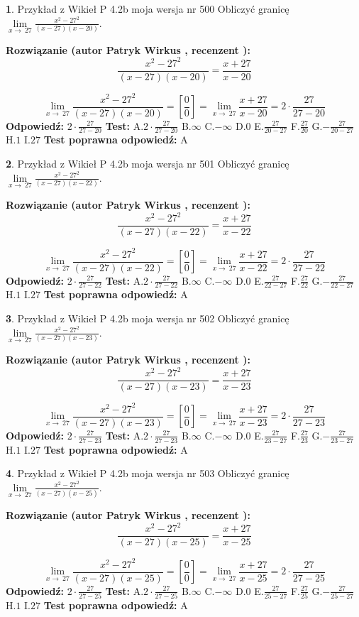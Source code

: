 \documentclass[12pt, a4paper]{article}
\theoremstyle{definition} %
\newtheorem{zad}{}
\newcommand{\zadStart}[1]{\begin{zad}#1\newline}
\newcommand{\zadStop}{\end{zad}}
\newcommand{\rozwStart}[2]{\noindent \textbf{Rozwiązanie (autor #1 , recenzent #2): }\newline}
\newcommand{\rozwStop}{\newline}
\newcommand{\odpStart}{\noindent \textbf{Odpowiedź:}\newline}
\newcommand{\odpStop}{\newline}
\newcommand{\testStart}{\noindent \textbf{Test:}\newline}
\newcommand{\testStop}{\newline}
\newcommand{\kluczStart}{\noindent \textbf{Test poprawna odpowiedź:}\newline}
\newcommand{\kluczStop}{\newline}
\begin{document}
\zadStart{Przykład z Wikieł P 4.2b moja wersja nr 500}
Obliczyć granicę $\lim\limits_{x\to\ 27}\frac{x^{2}-27^{2}}{(x-27)(x-20)}$.
\zadStop
\rozwStart{Patryk Wirkus}{}
$$\frac{x^{2}-27^{2}}{(x-27)(x-20)}=\frac{x+27}{x-20}$$

$$\lim\limits_{x\to\ 27}\frac{x^{2}-27^{2}}{(x-27)(x-20)}=[\frac{0}{0}]=\lim\limits_{x\to\ 27}\frac{x+27}{x-20}=2 \cdot \frac{27}{27-20}$$
\rozwStop
\odpStart
$2 \cdot \frac{27}{27-20}$
\odpStop
\testStart
A.$2 \cdot \frac{27}{27-20}$
B.$\infty$
C.$-\infty$
D.$0$
E.$\frac{27}{20-27}$
F.$\frac{27}{20}$
G.$-\frac{27}{20-27}$
H.$1$
I.$27$
\testStop
\kluczStart
A
\kluczStop



\zadStart{Przykład z Wikieł P 4.2b moja wersja nr 501}
Obliczyć granicę $\lim\limits_{x\to\ 27}\frac{x^{2}-27^{2}}{(x-27)(x-22)}$.
\zadStop
\rozwStart{Patryk Wirkus}{}
$$\frac{x^{2}-27^{2}}{(x-27)(x-22)}=\frac{x+27}{x-22}$$

$$\lim\limits_{x\to\ 27}\frac{x^{2}-27^{2}}{(x-27)(x-22)}=[\frac{0}{0}]=\lim\limits_{x\to\ 27}\frac{x+27}{x-22}=2 \cdot \frac{27}{27-22}$$
\rozwStop
\odpStart
$2 \cdot \frac{27}{27-22}$
\odpStop
\testStart
A.$2 \cdot \frac{27}{27-22}$
B.$\infty$
C.$-\infty$
D.$0$
E.$\frac{27}{22-27}$
F.$\frac{27}{22}$
G.$-\frac{27}{22-27}$
H.$1$
I.$27$
\testStop
\kluczStart
A
\kluczStop



\zadStart{Przykład z Wikieł P 4.2b moja wersja nr 502}
Obliczyć granicę $\lim\limits_{x\to\ 27}\frac{x^{2}-27^{2}}{(x-27)(x-23)}$.
\zadStop
\rozwStart{Patryk Wirkus}{}
$$\frac{x^{2}-27^{2}}{(x-27)(x-23)}=\frac{x+27}{x-23}$$

$$\lim\limits_{x\to\ 27}\frac{x^{2}-27^{2}}{(x-27)(x-23)}=[\frac{0}{0}]=\lim\limits_{x\to\ 27}\frac{x+27}{x-23}=2 \cdot \frac{27}{27-23}$$
\rozwStop
\odpStart
$2 \cdot \frac{27}{27-23}$
\odpStop
\testStart
A.$2 \cdot \frac{27}{27-23}$
B.$\infty$
C.$-\infty$
D.$0$
E.$\frac{27}{23-27}$
F.$\frac{27}{23}$
G.$-\frac{27}{23-27}$
H.$1$
I.$27$
\testStop
\kluczStart
A
\kluczStop



\zadStart{Przykład z Wikieł P 4.2b moja wersja nr 503}
Obliczyć granicę $\lim\limits_{x\to\ 27}\frac{x^{2}-27^{2}}{(x-27)(x-25)}$.
\zadStop
\rozwStart{Patryk Wirkus}{}
$$\frac{x^{2}-27^{2}}{(x-27)(x-25)}=\frac{x+27}{x-25}$$

$$\lim\limits_{x\to\ 27}\frac{x^{2}-27^{2}}{(x-27)(x-25)}=[\frac{0}{0}]=\lim\limits_{x\to\ 27}\frac{x+27}{x-25}=2 \cdot \frac{27}{27-25}$$
\rozwStop
\odpStart
$2 \cdot \frac{27}{27-25}$
\odpStop
\testStart
A.$2 \cdot \frac{27}{27-25}$
B.$\infty$
C.$-\infty$
D.$0$
E.$\frac{27}{25-27}$
F.$\frac{27}{25}$
G.$-\frac{27}{25-27}$
H.$1$
I.$27$
\testStop
\kluczStart
A
\kluczStop
\end{document}
